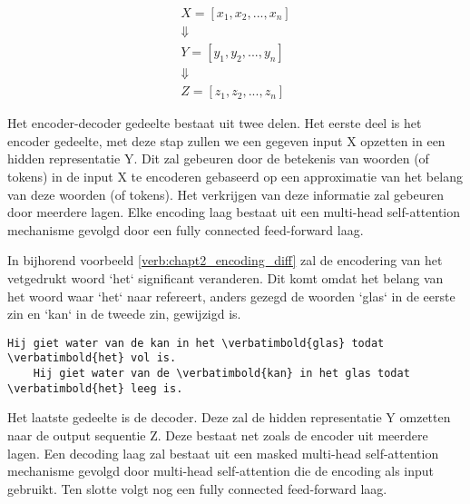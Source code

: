 \begin{equation}
\begin{split}
X = [x_1, x_2, ..., x_n]  \\
\Downarrow \;\;\;\;\;\;\;\;\;\;\;\;\;\;\; \\
Y = [y_1, y_2, ..., y_n] \\
\Downarrow \;\;\;\;\;\;\;\;\;\;\;\;\;\;\; \\
Z = [z_1, z_2, ..., z_n]
\end{split}
\end{equation}
\label{def:chapt2_transformers_encoder_decoder}    


Het encoder-decoder gedeelte bestaat uit twee delen. Het eerste deel is het encoder gedeelte, met deze stap zullen we een gegeven input X opzetten in een hidden representatie Y. Dit zal gebeuren door de betekenis van woorden (of tokens) in de input X te encoderen gebaseerd op een approximatie van het belang van deze woorden (of tokens). Het verkrijgen van deze informatie zal gebeuren door meerdere lagen. Elke encoding laag bestaat uit een multi-head self-attention mechanisme gevolgd door een fully connected feed-forward laag.     

In bijhorend voorbeeld \ref{verb:chapt2_encoding_diff} zal de encodering van het vetgedrukt woord `het` significant veranderen. Dit komt omdat het belang van het woord waar `het` naar refereert, anders gezegd de woorden `glas` in de eerste zin en `kan` in de tweede zin, gewijzigd is.

\begin{Verbatim}[commandchars=\\\{\}]
    Hij giet water van de kan in het \verbatimbold{glas} todat \verbatimbold{het} vol is.
    Hij giet water van de \verbatimbold{kan} in het glas todat \verbatimbold{het} leeg is.
\end{Verbatim}
\label{verb:chapt2_encoding_diff}    

Het laatste gedeelte is de decoder. Deze zal de hidden representatie Y omzetten naar de output sequentie Z. Deze bestaat net zoals de encoder uit meerdere lagen. Een decoding laag zal bestaat uit een masked multi-head self-attention mechanisme gevolgd door multi-head self-attention die de encoding als input gebruikt. Ten slotte volgt nog een fully connected feed-forward laag.



